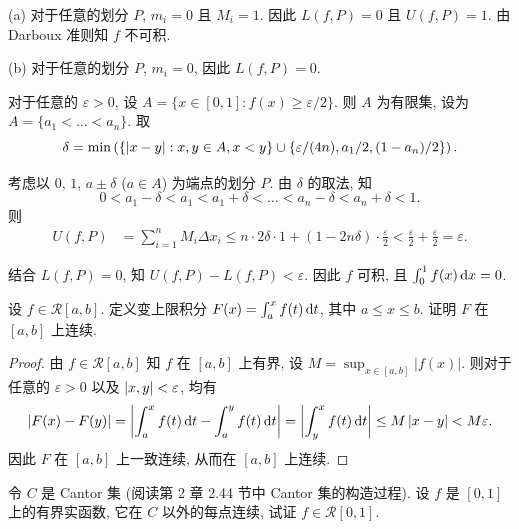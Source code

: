 ﻿\documentclass{article}
\begin{document}
\begin{solution}
  (a) 对于任意的划分 \( P \), \( m_i=0 \) 且 \( M_i=1 \). 因此 \( L(f,P)=0 \) 且 \( U(f,P)=1 \). 由 Darboux 准则知 \( f \) 不可积.

  (b) 对于任意的划分 \( P \), \( m_i=0 \), 因此 \( L(f,P)=0 \). 
  
  对于任意的 \( \varepsilon>0 \), 设 \( A=\{x\in[0,1]:f(x)\ge \varepsilon/2\} \). 则 \( A \) 为有限集, 设为 \( A=\{a_1<\dots<a_n\} \). 取 
  \[ \delta=\min\left( \{\left|x-y\right|:x,y\in A,x<y\} \cup \{\varepsilon/(4n),a_1/2,(1-a_n)/2\} \right). \] 

  考虑以 \( 0 \), \( 1 \), \( a\pm\delta \) (\( a\in A \)) 为端点的划分 \( P \). 由 \( \delta \) 的取法, 知
  \[ 0<a_1-\delta<a_1<a_1+\delta<\dots<a_n-\delta<a_n+\delta<1. \]
  则
  \begin{align*}
    U(f,P) & = \sum_{i=1}^{n} M_i \Delta x_i 
    \le n\cdot 2\delta \cdot 1 + \left( 1-2n\delta \right) \cdot \frac{\varepsilon}{2} < \frac{\varepsilon}{2}+\frac{\varepsilon}{2}=\varepsilon.
  \end{align*}

  结合 \( L(f,P)=0 \), 知 \( U(f,P)-L(f,P)<\varepsilon \). 因此 \( f \) 可积, 且 \( \int_0^1 f(x) \,\mathrm{d} x=0 \).
\end{solution}



\begin{problem}
设 $f \in \mathscr{R}[a, b]$. 定义变上限积分 $F(x) = \int_a^x f(t) \,\mathrm{d} t$, 其中 $a \le x \le b$. 证明 $F$ 在 $[a, b]$ 上连续.
\end{problem}

\begin{proof}
  由 \( f\in\mathscr{R}[a,b] \) 知 \( f \) 在 \( [a,b] \) 上有界, 设 \( M=\sup_{x\in[a,b]}|f(x)| \). 则对于任意的 \( \varepsilon>0 \) 以及 \( \left|x,y\right|<\varepsilon \), 均有
  \[ \left|F(x)-F(y)\right| = \left|\int_a^x f(t)\,\mathrm{d} t - \int_a^y f(t)\,\mathrm{d} t\right| = \left|\int_y^x f(t)\,\mathrm{d} t\right| \le M\left|x-y\right| < M\varepsilon. \]
  因此 \( F \) 在 \( [a,b] \) 上一致连续, 从而在 \( [a,b] \) 上连续.
\end{proof}



\begin{problem}
令 $C$ 是 Cantor 集 (阅读第 2 章 2.44 节中 Cantor 集的构造过程). 设 $f$ 是 $[0, 1]$ 上的有界实函数, 它在 $C$ 以外的每点连续, 试证 $f \in \mathscr{R}[0, 1]$.
\end{problem}
\end{document}
